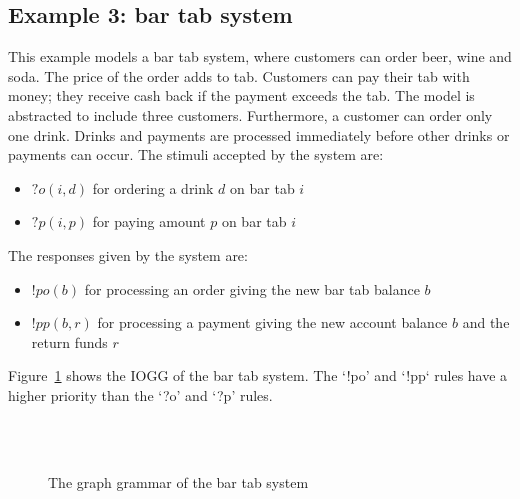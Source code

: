 %    

\subsection{Example 3: bar tab system}
This example models a bar tab system, where customers can order beer, wine and soda. The price of the order adds to tab. Customers can pay their tab with money; they receive cash back if the payment exceeds the tab. The model is abstracted to include three customers. Furthermore, a customer can order only one drink. Drinks and payments are processed immediately before other drinks or payments can occur. The stimuli accepted by the system are:
\begin{itemize}
\item $?o(i,d)$ for ordering a drink $d$ on bar tab $i$
\item $?p(i,p)$ for paying amount $p$ on bar tab $i$
\end{itemize}
The responses given by the system are:
\begin{itemize}
\item $!po(b)$ for processing an order giving the new bar tab balance $b$
\item $!pp(b,r)$ for processing a payment giving the new account balance $b$ and the return funds $r$
\end{itemize}

Figure~\ref{fig:gg-bartab} shows the IOGG of the bar tab system. The `!po' and `!pp` rules have a higher priority than the `?o' and `?p' rules.

\begin{figure}[ht]
  \begin{center}
    \\
    \hspace{20px}
    \\
    \hspace{20px}
  \end{center}
  \caption{The graph grammar of the bar tab system}
  \label{fig:gg-bartab}
\end{figure}

